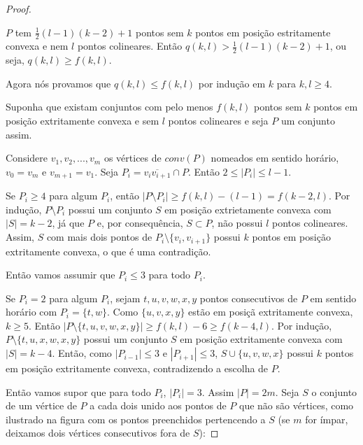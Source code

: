 \begin{proof}
\begin{center}
    \end{center}

    $P$ tem $\frac{1}{2}(l-1)(k-2)+1$ pontos sem $k$ pontos em posição estritamente convexa e nem $l$ pontos colineares. Então $q(k,l)>\frac{1}{2}(l-1)(k-2)+1$, ou seja, $q(k,l)\geq f(k,l)$.

    Agora nós provamos que $q(k,l)\leq f(k,l)$ por indução em $k$ para $k,l\geq 4$.

    Suponha que existam conjuntos com pelo menos $f(k,l)$ pontos sem $k$ pontos em posição extritamente convexa e sem $l$ pontos colineares e seja $P$ um conjunto assim.

    Considere $v_1,v_2,...,v_m$ os vértices de $conv(P)$ nomeados em sentido horário, $v_0 = v_m$ e $v_{m+1}=v_1$. Seja $P_i=\overline{v_iv_{i+1}}\cap P$. Então $2\leq|P_i|\leq l-1$.

    Se $P_i\geq 4$ para algum $P_i$, então $|P\setminus P_i|\geq f(k,l)-(l-1) = f(k-2,l)$. Por indução, $P\setminus P_i$ possui um conjunto $S$ em posição extrietamente convexa com $|S|=k-2$, já que $P$ e, por consequência, $S\subset P$, não possui $l$ pontos colineares. Assim, $S$ com mais dois pontos de $P_i\setminus\{v_i, v_{i+1}\}$ possui $k$ pontos em posição extritamente convexa, o que é uma contradição.

    Então vamos assumir que $P_i\leq 3$ para todo $P_i$.

    Se $P_i = 2$ para algum $P_i$, sejam $t,u,v,w,x,y$ pontos consecutivos de $P$ em sentido horário com $P_i=\{t,w\}$. Como $\{u,v,x,y\}$ estão em posiçã extritamente convexa, $k\geq 5$. Então $|P\setminus\{t,u,v,w,x,y\}|\geq f(k,l)-6 \geq f(k-4,l)$. Por indução, $P\setminus \{t,u,x,w,x,y\}$ possui um conjunto $S$ em posição extritamente convexa com $|S|=k-4$. Então, como $|P_{i-1}|\leq 3$ e $|P_{i+1}|\leq 3$, $S\cup\{u,v,w,x\}$ possui $k$ pontos em posição extritamente convexa, contradizendo a escolha de $P$.

    Então vamos supor que para todo $P_i$, $|P_i|=3$. Assim $|P|=2m$. Seja $S$ o conjunto de um vértice de $P$ a cada dois unido aos pontos de $P$ que não são vértices, como ilustrado na figura com os pontos preenchidos pertencendo a $S$ (se $m$ for ímpar, deixamos dois vértices consecutivos fora de $S$):


\end{proof}
